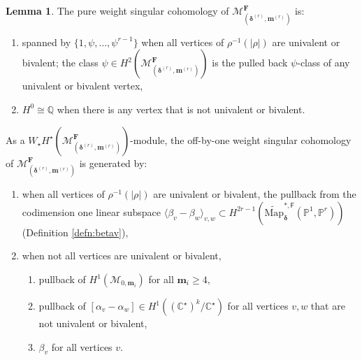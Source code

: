 \documentclass[12pt,reqno]{amsart}
\theoremstyle{definition}
\theoremstyle{definition}
\theoremstyle{definition}
\theoremstyle{definition}
\newtheorem{lemma}[theorem]{Lemma}
\begin{document}
\begin{lemma}\label{lem:MF}
  The pure weight singular cohomology of $\mathcal{M}^{\mathbf{F}}_{(\boldsymbol{\delta}^{(r)}, \boldsymbol{m}^{(r)})}$ is: \begin{enumerate}
    \item spanned by $\{1, \psi,\dots, \psi^{r-1}\}$ when all vertices of $\rho^{-1}(|\rho|)$ are univalent or bivalent; the class $\psi\in H^2(\mathcal{M}^{\mathbf{F}}_{(\boldsymbol{\delta}^{(r)}, \boldsymbol{m}^{(r)})})$ is the pulled back $\psi$-class of any univalent or bivalent vertex,
    \item $H^0\cong \mathbb{Q}$ when there is any vertex that is not univalent or bivalent.
  \end{enumerate}

  As a $W_\star H^\star(\mathcal{M}^{\mathbf{F}}_{(\boldsymbol{\delta}^{(r)}, \boldsymbol{m}^{(r)})})$-module, the off-by-one weight singular cohomology of $\mathcal{M}^{\mathbf{F}}_{(\boldsymbol{\delta}^{(r)}, \boldsymbol{m}^{(r)})}$ is generated by:
  \begin{enumerate}
    \item when all vertices of $\rho^{-1}(|\rho|)$ are univalent or bivalent, the pullback from the codimension one linear subspace $\langle \beta_v-\beta_w\rangle_{v,w} \subset H^{2r-1}(\widetilde{\mathrm{Map}}_{\boldsymbol{\delta}}^{*, \mathsf{F}}(\mathbb{P}^1, \mathbb{P}^r))$ (Definition \ref{defn:betav}), 
    \item when not all vertices are univalent or bivalent, \begin{enumerate}
      \item pullback of $H^1(\mathcal{M}_{0, \boldsymbol{m}_i})$ for all $\boldsymbol{m}_i\geq 4,$
      \item pullback of $[\alpha_v-\alpha_w]\in H^1((\mathbb{C}^\star)^k/\mathbb{C}^\star)$ for all vertices $v,w$ that are not univalent or bivalent,
      \item $\beta_v$ for all vertices $v.$
    \end{enumerate}
  \end{enumerate}
\end{lemma}
\end{document}
